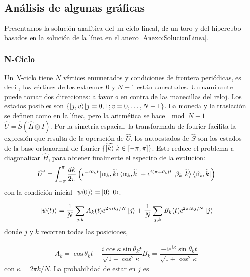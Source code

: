 \subsection{Análisis de algunas gráficas}
Presentamos la solución analítica del un ciclo lineal, de un toro y del hipercubo basados en la solución de la línea en el anexo \ref{Anexo:SolucionLinea}.

\subsubsection*{N-Ciclo}
Un $N$-ciclo tiene $N$ vértices enumerados y condiciones de frontera periódicas, es decir, los vértices de los extremos $0$ y $N-1$ están conectados. Un caminante puede tomar dos direcciones: a favor o en contra de las manecillas del reloj.  Los estados posibles son $\{\ket{j,v}|j=0,1;v=0,\dots,N-1\}$.
La moneda y la traslación se definen como en la línea, pero la aritmética se hace $\mod{N-1}$
$\hat{U}=\hat{S}(\hat{H}\otimes I)$. Por la simetría espacial, la transformada de fourier facilita la expresión que resulta de la operación de $\hat{U}$, los autoestados de $\hat{S}$
son los estados de la base ortonormal de fourier $\{\widetilde{\ket{k}}|k\in [-\pi,\pi] \}$. Esto reduce el problema a diagonalizar $\hat{H}$, para obtener finalmente el espectro de la evolución:
\begin{equation}
    \hat{U}^t=\int_{-\pi}^\pi\frac{dk}{2\pi}\left(e^{-i\theta_kt}\ket{\alpha_k,\widetilde{k}}\bra{\alpha_k,\widetilde{k}}+e^{i(\pi+\theta_k)t}\ket{\beta_k,\widetilde{k}}\bra{\beta_k,\widetilde{k}}\right)
\end{equation}{}
con la condición inicial $\ket{\psi(0)}=\ket{0}\ket{0}$.

\begin{equation}
\ket{\psi(t)}=\dfrac{1}{N}    \sum_{j,k}A_k(t)e^{2\pi ikj/N}\ket{j}+\dfrac{1}{N}    \sum_{j,k}B_k(t)e^{2\pi ikj/N}\ket{j}
\end{equation}
donde $j$ y $k$ recorren todas las posiciones,

\begin{align}
    A_k=\cos\theta_k t-\dfrac{i\cos\kappa\sin\theta_kt}{\sqrt{1+\cos^2\kappa }}
    B_k=\dfrac{-ie^{i\kappa}\sin\theta_kt}{\sqrt{1+\cos^2\kappa}}
\end{align}
con $\kappa=2\pi k/N$. La probabilidad de estar en $j$ es

